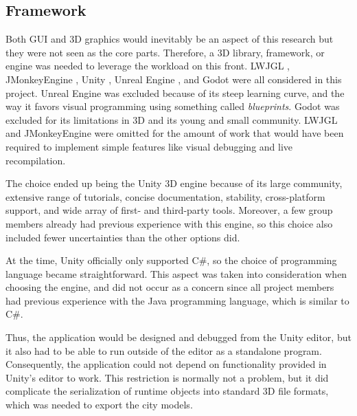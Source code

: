 \subsection{Framework}

Both GUI and 3D graphics would inevitably be an aspect of this research but they were not seen as the core parts.
Therefore, a 3D library, framework, or engine was needed to leverage the workload on this front.
LWJGL \cite{lwjgl}, JMonkeyEngine \cite{jmonkey}, Unity \cite{unity}, Unreal Engine \cite{unreal}, and Godot \cite{godot} were all considered in this project.
Unreal Engine was excluded because of its steep learning curve, and the way it favors visual programming using something called \textit{blueprints}.
Godot was excluded for its limitations in 3D and its young and small community.
LWJGL and JMonkeyEngine were omitted for the amount of work that would have been required to implement simple features like visual debugging and live recompilation.

The choice ended up being the Unity 3D engine because of its large community, extensive range of tutorials, concise documentation, stability, cross-platform support, and wide array of first- and third-party tools.
Moreover, a few group members already had previous experience with this engine, so this choice also included fewer uncertainties than the other options did.

At the time, Unity officially only supported C\#, so the choice of programming language became straightforward.
This aspect was taken into consideration when choosing the engine, and did not occur as a concern since all project members had previous experience with the Java programming language, which is similar to C\#.

Thus, the application would be designed and debugged from the Unity editor, but it also had to be able to run outside of the editor as a standalone program.
Consequently, the application could not depend on functionality provided in Unity's editor to work.
This restriction is normally not a problem, but it did complicate the serialization of runtime objects into standard 3D file formats, which was needed to export the city models.